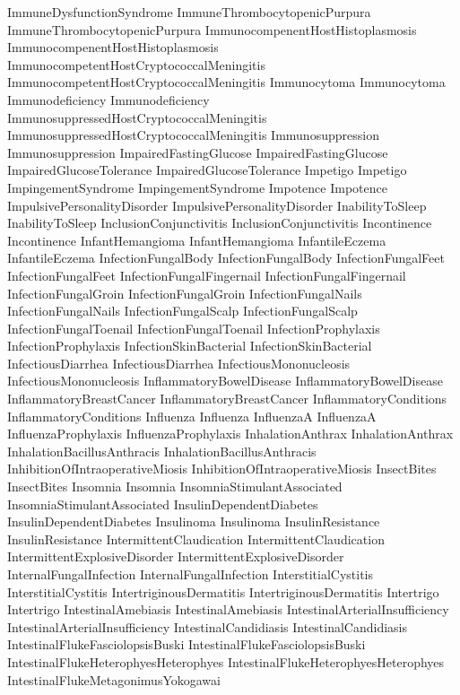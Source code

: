  ImmuneDysfunctionSyndrome
 ImmuneThrombocytopenicPurpura
 ImmuneThrombocytopenicPurpura
 ImmunocompenentHostHistoplasmosis
 ImmunocompenentHostHistoplasmosis
 ImmunocompetentHostCryptococcalMeningitis
 ImmunocompetentHostCryptococcalMeningitis
 Immunocytoma
 Immunocytoma
 Immunodeficiency
 Immunodeficiency
 ImmunosuppressedHostCryptococcalMeningitis
 ImmunosuppressedHostCryptococcalMeningitis
 Immunosuppression
 Immunosuppression
 ImpairedFastingGlucose
 ImpairedFastingGlucose
 ImpairedGlucoseTolerance
 ImpairedGlucoseTolerance
 Impetigo
 Impetigo
 ImpingementSyndrome
 ImpingementSyndrome
 Impotence
 Impotence
 ImpulsivePersonalityDisorder
 ImpulsivePersonalityDisorder
 InabilityToSleep
 InabilityToSleep
 InclusionConjunctivitis
 InclusionConjunctivitis
 Incontinence
 Incontinence
 InfantHemangioma
 InfantHemangioma
 InfantileEczema
 InfantileEczema
 InfectionFungalBody
 InfectionFungalBody
 InfectionFungalFeet
 InfectionFungalFeet
 InfectionFungalFingernail
 InfectionFungalFingernail
 InfectionFungalGroin
 InfectionFungalGroin
 InfectionFungalNails
 InfectionFungalNails
 InfectionFungalScalp
 InfectionFungalScalp
 InfectionFungalToenail
 InfectionFungalToenail
 InfectionProphylaxis
 InfectionProphylaxis
 InfectionSkinBacterial
 InfectionSkinBacterial
 InfectiousDiarrhea
 InfectiousDiarrhea
 InfectiousMononucleosis
 InfectiousMononucleosis
 InflammatoryBowelDisease
 InflammatoryBowelDisease
 InflammatoryBreastCancer
 InflammatoryBreastCancer
 InflammatoryConditions
 InflammatoryConditions
 Influenza
 Influenza
 InfluenzaA
 InfluenzaA
 InfluenzaProphylaxis
 InfluenzaProphylaxis
 InhalationAnthrax
 InhalationAnthrax
 InhalationBacillusAnthracis
 InhalationBacillusAnthracis
 InhibitionOfIntraoperativeMiosis
 InhibitionOfIntraoperativeMiosis
 InsectBites
 InsectBites
 Insomnia
 Insomnia
 InsomniaStimulantAssociated
 InsomniaStimulantAssociated
 InsulinDependentDiabetes
 InsulinDependentDiabetes
 Insulinoma
 Insulinoma
 InsulinResistance
 InsulinResistance
 IntermittentClaudication
 IntermittentClaudication
 IntermittentExplosiveDisorder
 IntermittentExplosiveDisorder
 InternalFungalInfection
 InternalFungalInfection
 InterstitialCystitis
 InterstitialCystitis
 IntertriginousDermatitis
 IntertriginousDermatitis
 Intertrigo
 Intertrigo
 IntestinalAmebiasis
 IntestinalAmebiasis
 IntestinalArterialInsufficiency
 IntestinalArterialInsufficiency
 IntestinalCandidiasis
 IntestinalCandidiasis
 IntestinalFlukeFasciolopsisBuski
 IntestinalFlukeFasciolopsisBuski
 IntestinalFlukeHeterophyesHeterophyes
 IntestinalFlukeHeterophyesHeterophyes
 IntestinalFlukeMetagonimusYokogawai
